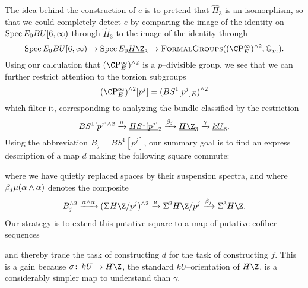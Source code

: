 The idea behind the construction of \(e\) is to pretend that \(\widehat \Pi_3\) is an isomorphism, so that we could completely detect \(e\) by comparing the image of the identity on \(\operatorname{Spec} E_0 BU[6, \infty)\) through \(\widehat \Pi_3\) to the image of the identity through \[\Spec E_0 BU[6, \infty) \to \Spec E_0 \OS{H\Z}{3} \to \CatOf{FormalGroups}((\CP^\infty_E)^{\sm 2}, \Gm).\]  Using our calculation that \((\CP^\infty_E)^{\sm 2}\) is a \(p\)--divisible group, we see that we can further restrict attention to the torsion subgroups \[(\CP^\infty_E)^{\sm 2}[p^j] = (BS^1[p^j]_E)^{\sm 2}\] which filter it, corresponding to analyzing the bundle classified by the restriction \[BS^1[p^j]^{\sm 2} \xrightarrow{\mu} \OS{HS^1[p^j]}{2} \xrightarrow{\beta_j} \OS{H\Z}{3} \xrightarrow{\gamma} \OS{kU}{6}.\]  Using the abbreviation \(B_j = BS^1[p^j]\), our summary goal is to find an express description of a map \(d\) making the following square commute:
\begin{center}
\end{center}
where we have quietly replaced spaces by their suspension spectra, and where \(\beta_j \mu(\alpha \wedge \alpha)\) denotes the composite \[B_j^{\sm 2} \xrightarrow{\alpha \sm \alpha} (\Susp H\Z/p^j)^{\sm 2} \xrightarrow{\mu} \Susp^2 H\Z/p^j \xrightarrow{\beta_j} \Susp^3 H\Z.\]  Our strategy is to extend this putative square to a map of putative cofiber sequences
\begin{center}
\end{center}
and thereby trade the task of constructing \(d\) for the task of constructing \(f\).  This is a gain because \(\sigma\co kU \to H\Z\), the standard \(kU\)--orientation of \(H\Z\), is a considerably simpler map to understand than \(\gamma\).

